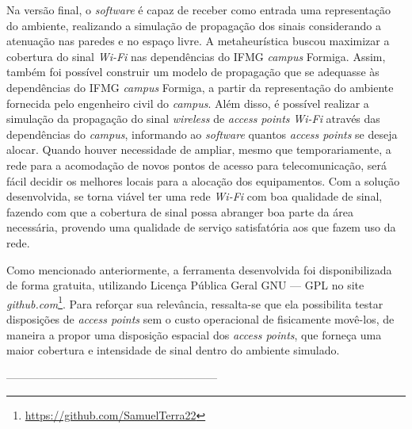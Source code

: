 \documentclass[
	12pt,				%
	twoside,			%
	a4paper,			%
	english,			%
	french,				%
	spanish,			%
	brazil				%
	]{abntex2}
\begin{document}
Na versão final, o \emph{software} é capaz de receber como entrada uma
representação do ambiente, realizando a simulação de propagação dos
sinais considerando a atenuação nas paredes e no espaço livre. A
metaheurística buscou maximizar a cobertura do sinal \emph{Wi-Fi} nas
dependências do IFMG \emph{campus} Formiga. Assim, também foi possível
construir um modelo de propagação que se adequasse às dependências do
IFMG \emph{campus} Formiga, a partir da representação do ambiente
fornecida pelo engenheiro civil do \emph{campus}. Além disso, é possível
realizar a simulação da propagação do sinal \emph{wireless} de
\emph{access points} \emph{Wi-Fi} através das dependências do
\emph{campus}, informando ao \emph{software} quantos \emph{access
points} se deseja alocar. Quando houver necessidade de ampliar, mesmo
que temporariamente, a rede para a acomodação de novos pontos de acesso
para telecomunicação, será fácil decidir os melhores locais para a
alocação dos equipamentos. Com a solução desenvolvida, se torna viável
ter uma rede \emph{Wi-Fi} com boa qualidade de sinal, fazendo com que a
cobertura de sinal possa abranger boa parte da área necessária, provendo
uma qualidade de serviço satisfatória aos que fazem uso da rede.

Como mencionado anteriormente, a ferramenta desenvolvida foi
disponibilizada de forma gratuita, utilizando Licença Pública Geral GNU
--- GPL no site \emph{github.com}\footnote{\url{https://github.com/SamuelTerra22}}.
Para reforçar sua relevância, ressalta-se que ela possibilita testar
disposições de \emph{access points} sem o custo operacional de
fisicamente movê-los, de maneira a propor uma disposição espacial dos
\emph{access points}, que forneça uma maior cobertura e intensidade de
sinal dentro do ambiente simulado.

---------------------------------------------------------

\postextual

\postextual



\end{document}
